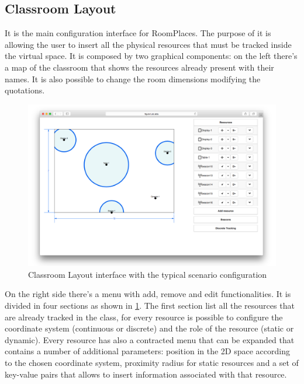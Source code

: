 \subsection{Classroom Layout}
It is the main configuration interface for RoomPlaces. The purpose of it is allowing the user to insert all the physical resources that must be tracked inside the virtual space. It is composed by two graphical components: on the left there's a map of the classroom that shows the resources already present with their names. It is also possible to change the room dimensions modifying the quotations.

\begin{figure}
\centering
\includegraphics[width=6in]{images/classroom-layout-map.png}
\caption{Classroom Layout interface with the typical scenario configuration}
\label{fig:classroom_layout_map}
\end{figure}

On the right side there's a menu with add, remove and edit functionalities. It is divided in four sections as shown in \ref{fig:classroom_layout_map}. The first section list all the resources that are already tracked in the class, for every resource is possible to configure the coordinate system (continuous or discrete) and the role of the resource (static or dynamic). Every resource has also a contracted menu that can be expanded that contains a number of additional parameters: position in the 2D space according to the chosen coordinate system, proximity radius for static resources and a set of key-value pairs that allows to insert information associated with that resource.


